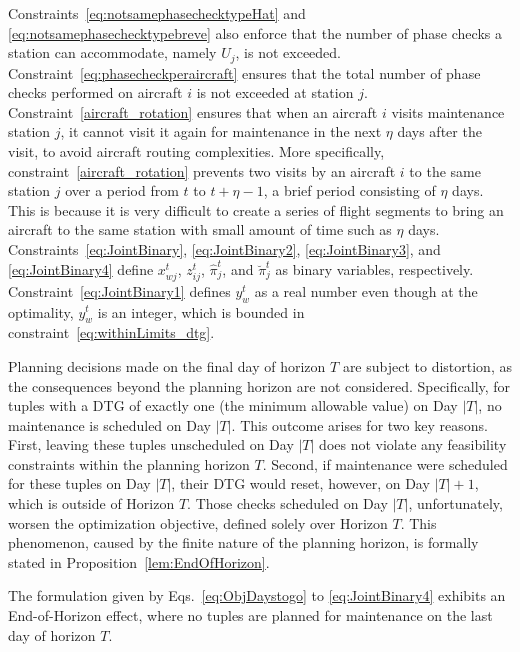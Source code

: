 Constraints~\eqref{eq:notsamephasechecktypeHat} and \eqref{eq:notsamephasechecktypebreve} also enforce that the number of phase checks a station can accommodate, namely $U_j$, is not exceeded.
Constraint~\eqref{eq:phasecheckperaircraft} ensures that the total number of phase checks performed on aircraft $i$ is not exceeded at station $j$.
Constraint~\eqref{aircraft_rotation} ensures that when an aircraft $i$ visits maintenance station $j$, it cannot visit it again for maintenance in the next $\eta$ days after the visit, to avoid aircraft routing complexities. More specifically, constraint~\eqref{aircraft_rotation} prevents two visits by an aircraft $i$ to the same station $j$ over a period from $t$ to $t + \eta -1$, a brief period consisting of $\eta$ days. This is because it is very difficult to create a series of flight segments to bring an aircraft to the same station with small amount of time such as $\eta$ days.
Constraints~\eqref{eq:JointBinary}, \eqref{eq:JointBinary2}, \eqref{eq:JointBinary3}, and \eqref{eq:JointBinary4} define $x_{wj}^t$, $z_{ij}^t$, $\hat{\pi}_j^t$, and $\breve{\pi}_j^t$  as binary variables, respectively. 
Constraint~\eqref{eq:JointBinary1} defines $y_w^t$ as a real number even though at the optimality, $y_w^t$ is an integer, which is bounded in constraint~\eqref{eq:withinLimits_dtg}.

Planning decisions made on the final day of horizon $T$ are subject to distortion, as the consequences beyond the planning horizon are not considered. Specifically, for tuples with a DTG of exactly one (the minimum allowable value) on Day $|T|$, no maintenance is scheduled on Day $|T|$. This outcome arises for two key reasons. First, leaving these tuples unscheduled on Day $|T|$ does not violate any feasibility constraints within the planning horizon $T$. Second, if maintenance were scheduled for these tuples on Day $|T|$, their DTG would reset, however, on Day $|T| + 1$, which is outside of Horizon $T$. Those checks scheduled on Day $|T|$, unfortunately, worsen the optimization objective, defined solely over Horizon $T$. 
This phenomenon, caused by the finite nature of the planning horizon, is formally stated in  
Proposition~\ref{lem:EndOfHorizon}. 

\begin{lem}
\label{lem:EndOfHorizon}
The formulation given by Eqs.~\eqref{eq:ObjDaystogo} to \eqref{eq:JointBinary4} exhibits an End-of-Horizon effect, where no tuples are planned for maintenance on the last day of horizon $T$.
\end{lem}

